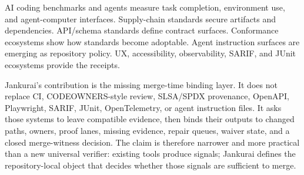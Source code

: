 AI coding benchmarks and agents measure task completion, environment use, and agent-computer interfaces. Supply-chain standards secure artifacts and dependencies. API/schema standards define contract surfaces. Conformance ecosystems show how standards become adoptable. Agent instruction surfaces are emerging as repository policy. UX, accessibility, observability, SARIF, and JUnit ecosystems provide the receipts.

Jankurai's contribution is the missing merge-time binding layer. It does not replace CI, CODEOWNERS-style review, SLSA/SPDX provenance, OpenAPI, Playwright, SARIF, JUnit, OpenTelemetry, or agent instruction files. It asks those systems to leave compatible evidence, then binds their outputs to changed paths, owners, proof lanes, missing evidence, repair queues, waiver state, and a closed merge-witness decision. The claim is therefore narrower and more practical than a new universal verifier: existing tools produce signals; Jankurai defines the repository-local object that decides whether those signals are sufficient to merge.
